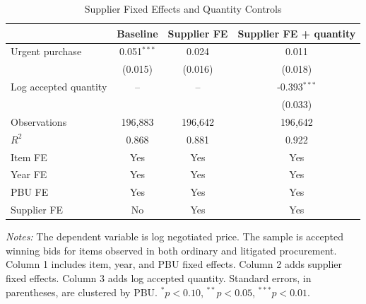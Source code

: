 \begin{table}[ht]
\centering
\caption{Supplier Fixed Effects and Quantity Controls}
\label{tab:supplier_fe}
\begin{threeparttable}
\small
\setlength{\tabcolsep}{5pt}
\begin{tabular}{lccc}
\toprule
 & Baseline & Supplier FE & Supplier FE + quantity \\
\midrule
Urgent purchase & 0.051$^{***}$ & 0.024 & 0.011 \\
 & (0.015) & (0.016) & (0.018) \\
Log accepted quantity & -- & -- & -0.393$^{***}$ \\
 &  &  & (0.033) \\
\addlinespace
Observations & 196{,}883 & 196{,}642 & 196{,}642 \\
$R^2$ & 0.868 & 0.881 & 0.922 \\
Item FE & Yes & Yes & Yes \\
Year FE & Yes & Yes & Yes \\
PBU FE & Yes & Yes & Yes \\
Supplier FE & No & Yes & Yes \\
\bottomrule
\end{tabular}
\begin{tablenotes}[flushleft]\footnotesize
\item \textit{Notes:} The dependent variable is log negotiated price. The sample is accepted winning bids for items observed in both ordinary and litigated procurement. Column 1 includes item, year, and PBU fixed effects. Column 2 adds supplier fixed effects. Column 3 adds log accepted quantity. Standard errors, in parentheses, are clustered by PBU. $^{*}p<0.10$, $^{**}p<0.05$, $^{***}p<0.01$.
\end{tablenotes}
\end{threeparttable}
\end{table}
